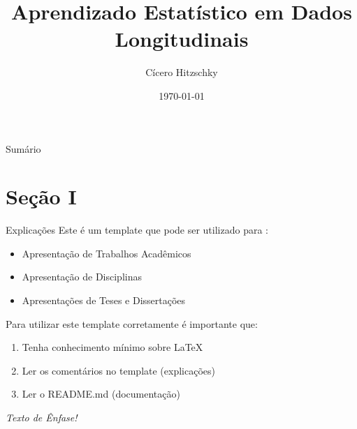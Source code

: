 \documentclass{libs/ufc_format}
\title[Aprendizado Estatístico em Dados Longitudinais]{\huge\textbf{Aprendizado Estatístico em Dados Longitudinais}}
\subtitle{}
\author{Cícero Hitzschky}
\institute[UFC]{
    \normalsize{\email{cicero.hitzschky@alu.ufc.br}}
    \newline
    \department{Departamento de Estatística e Matemática Aplicada}
    \newline
    \ufc
}
\date{\today}
\begin{document}


\begin{frame}{}
    \maketitle
\end{frame}

\begin{frame}{Sumário}
    \begin{multicols}{2}
        \tableofcontents
    \end{multicols}
\end{frame}


\section{Seção I}
\begin{frame}{Explicações}
    Este é um template que pode ser utilizado para \nocite{Template_Beamer_UFC}:
    \begin{itemize}
        \item Apresentação de Trabalhos Acadêmicos
        \item Apresentação de Disciplinas
        \item Apresentações de Teses e Dissertações
    \end{itemize}

    \vspace{0.4cm} %
    
    Para utilizar este template corretamente é importante que:
    \begin{enumerate}
        \item Tenha conhecimento mínimo sobre LaTeX
        \item Ler os comentários no template (explicações)
        \item Ler o README.md (documentação)
    \end{enumerate}

    \vspace{0.2cm}

     \emph{Texto de Ênfase!}
\end{frame}
\end{document}
